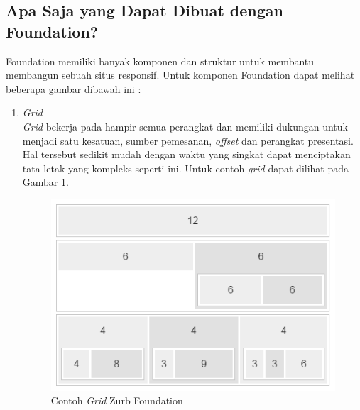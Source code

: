 
\subsection{Apa Saja yang Dapat Dibuat dengan Foundation?}
Foundation memiliki banyak komponen dan struktur untuk membantu membangun sebuah
situs responsif. Untuk komponen Foundation dapat melihat beberapa gambar dibawah
ini :

\begin{enumerate}[(1)]
\item {\it Grid}\\
{\it Grid} bekerja pada hampir semua perangkat dan memiliki dukungan untuk menjadi
satu kesatuan, sumber pemesanan, {\it offset} dan perangkat presentasi. Hal
tersebut sedikit mudah dengan waktu yang singkat dapat menciptakan tata letak yang
kompleks seperti ini. Untuk contoh {\it grid} dapat dilihat pada Gambar
\ref{fig:grid}.

\begin{figure}[H]
\centering
\includegraphics[scale=1]{Gambar/grid.png}
\caption[Contoh {\it Grid} Zurb Foundation]{Contoh {\it Grid} Zurb Foundation}
\label{fig:grid}
\end{figure}


\end{enumerate}
